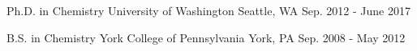 


\begin{cventries}


\cventry
{Ph.D. in Chemistry
} %
{University of Washington} %
{Seattle, WA} %
{Sep. 2012 - June 2017} %
{}



\cventry
{B.S. in Chemistry} %
{York College of Pennsylvania} %
{York, PA} %
{Sep. 2008 - May 2012} %
{}


\end{cventries}
